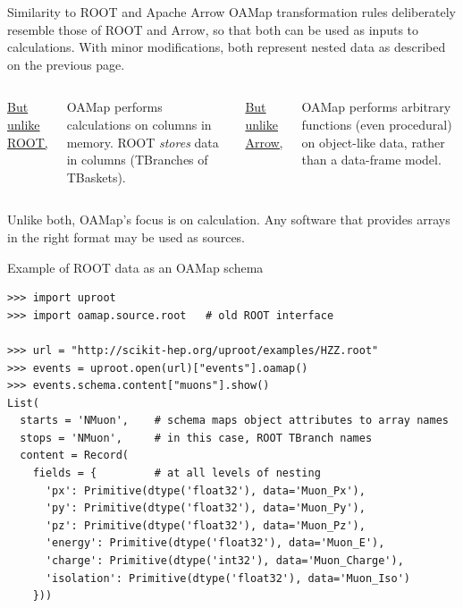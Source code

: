 \documentclass[aspectratio=169]{beamer}
\begin{document}
\begin{frame}{Similarity to ROOT and Apache Arrow}
\vspace{0.5 cm}
OAMap transformation rules deliberately resemble those of ROOT and Arrow, so that both can be used as inputs to calculations. With minor modifications, both represent nested data as described on the previous page.

\vspace{-0.2 cm}
\begin{columns}[t]
\begin{center}
\large \underline{But unlike ROOT,}
\end{center}

OAMap performs calculations on columns in memory. ROOT {\it stores} data in columns (TBranches of TBaskets).

\begin{center}
\large \underline{But unlike Arrow,}
\end{center}

OAMap performs arbitrary functions (even procedural) on object-like data, rather than a data-frame model.
\end{columns}

\vspace{0.7 cm}
Unlike both, OAMap's focus is on calculation. Any software that provides arrays in the right format may be used as sources.
\end{frame}

\begin{frame}[fragile]{Example of ROOT data as an OAMap schema}
\small
\begin{verbatim}
>>> import uproot
>>> import oamap.source.root   # old ROOT interface

>>> url = "http://scikit-hep.org/uproot/examples/HZZ.root"
>>> events = uproot.open(url)["events"].oamap()
>>> events.schema.content["muons"].show()
List(
  starts = 'NMuon',    # schema maps object attributes to array names
  stops = 'NMuon',     # in this case, ROOT TBranch names
  content = Record(
    fields = {         # at all levels of nesting
      'px': Primitive(dtype('float32'), data='Muon_Px'),
      'py': Primitive(dtype('float32'), data='Muon_Py'),
      'pz': Primitive(dtype('float32'), data='Muon_Pz'),
      'energy': Primitive(dtype('float32'), data='Muon_E'),
      'charge': Primitive(dtype('int32'), data='Muon_Charge'),
      'isolation': Primitive(dtype('float32'), data='Muon_Iso')
    }))
\end{verbatim}
\end{frame}
\end{document}
